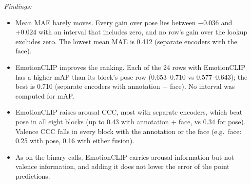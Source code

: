 \documentclass[11pt]{article}
\begin{document}
\begin{table}[!htbp]
{\emph{Findings:}
\begin{itemize}
  \item Mean MAE barely moves. Every gain over pose lies between $-0.036$ and $+0.024$ with an interval that includes zero, and no row's gain over the lookup excludes zero. The lowest mean MAE is 0.412 (separate encoders with the face).
  \item EmotionCLIP improves the ranking. Each of the 24 rows with EmotionCLIP has a higher mAP than its block's pose row (0.653--0.710 vs 0.577--0.643); the best is 0.710 (separate encoders with annotation + face). No interval was computed for mAP.
  \item EmotionCLIP raises arousal CCC, most with separate encoders, which beat pose in all eight blocks (up to 0.43 with annotation + face, vs 0.34 for pose). Valence CCC falls in every block with the annotation or the face (e.g.\ face: 0.25 with pose, 0.16 with either fusion).
  \item As on the binary calls, EmotionCLIP carries arousal information but not valence information, and adding it does not lower the error of the point predictions.
\end{itemize}}
\end{table}
\end{document}
